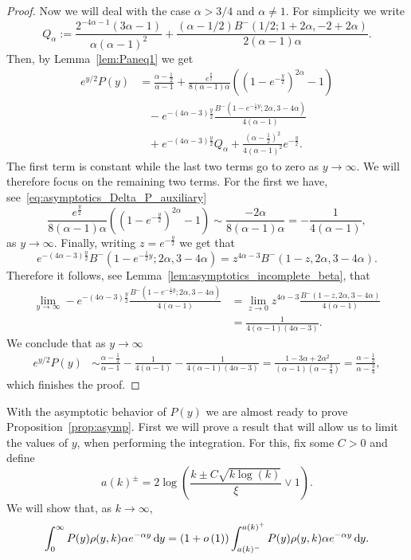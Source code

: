 \begin{proof}
Now we will deal with the case $\alpha > 3/4$ and $\alpha \not = 1$. For simplicity we write
\[
	Q_\alpha := \frac{2^{-4 \alpha-1} (3 \alpha - 1)}{\alpha (\alpha - 1)^2} 
		+ \frac{(\alpha - 1/2 ) B^-(1/2; 1 + 2 \alpha, -2 + 2 \alpha)}{2(\alpha - 1) \alpha}.
\]
Then, by Lemma~\ref{lem:Paneq1} we get
\begin{align*}
	e^{y/2} P(y) &= \frac{\alpha - \frac{1}{2}}{\alpha - 1} 
		+ \frac{e^{\frac{y}{2}}}{8(\alpha - 1)\alpha}\left(\left(1 - e^{-\frac{y}{2}}\right)^{2\alpha}-1\right)\\
	&\hspace{10pt}- e^{-(4\alpha - 3)\frac{y}{2}}\frac{B^-(1 - e^{-\frac{1}{2}y}; 2 \alpha, 3 - 4 \alpha)}{4 (\alpha - 1)}\\
	&\hspace{10pt}+ e^{-(4\alpha - 3)\frac{y}{2}}Q_\alpha + \frac{(\alpha-\frac{1}{2})^2}{4(\alpha-1)^2} e^{-\frac{y}{2}}.
\end{align*}
The first term is constant while the last two terms go to zero as $y \to \infty$. We will therefore focus on the remaining two terms. For the first we have, see~\eqref{eq:asymptotics_Delta_P_auxiliary} 
\[
	\frac{e^{\frac{y}{2}}}{8(\alpha - 1)\alpha}\left(\left(1 - e^{-\frac{y}{2}}\right)^{2\alpha}-1\right) 
	\sim \frac{-2\alpha}{8(\alpha - 1)\alpha} = -\frac{1}{4(\alpha -1)},
\]
as $y \to \infty$. Finally, writing $z = e^{-\frac{y}{2}}$ we get that
\[
	e^{-(4\alpha - 3)\frac{y}{2}} B^-(1 - e^{-\frac{1}{2}y}; 2 \alpha, 3 - 4 \alpha)
	= z^{4\alpha - 3} B^-(1 - z, 2 \alpha, 3 - 4 \alpha).
\]
Therefore it follows, see Lemma~\ref{lem:asymptotics_incomplete_beta}, that
\begin{align*}
	\lim_{y \to \infty} - e^{-(4\alpha - 3)\frac{y}{2}}
		\frac{B^-(1 - e^{-\frac{1}{2}y}; 2 \alpha, 3 - 4 \alpha)}{4 (\alpha - 1)}
	&= \lim_{z \to 0} z^{4\alpha - 3} \frac{B^-(1 - z, 2 \alpha, 3 - 4 \alpha)}{4(\alpha - 1)}\\
	&= \frac{1}{4(\alpha - 1)(4\alpha - 3)}.
\end{align*}
We conclude that as $y \to \infty$
\begin{align*}
	e^{y/2} P(y) 
	&\sim \frac{\alpha - \frac{1}{2}}{\alpha - 1} -\frac{1}{4(\alpha -1)} - \frac{1}{4(\alpha - 1)(4\alpha - 3)}
	= \frac{1 - 3\alpha + 2 \alpha^2}{(\alpha - 1)(\alpha - \frac{3}{4})} 
	= \frac{\alpha - \frac{1}{2}}{\alpha - \frac{3}{4}},
\end{align*}
which finishes the proof.
\end{proof}

With the asymptotic behavior of $P(y)$ we are almost ready to prove Proposition~\ref{prop:asymp}. First we will prove a result that will allow us to limit the values of $y$, when performing the integration. For this, fix some $C > 0$ and define
\[
	a(k)^\pm = 2 \log\left(\frac{k \pm C \sqrt{k \log(k)}}{\xi} \vee 1\right).
\] 
We will show that, as $k \to \infty$,
\begin{equation}\label{eq:asymptotics_average_clustering_concentration}
	\int_0^\infty P(y) \rho(y,k) \alpha e^{-\alpha y} \operatorname{\mathrm{d}\hspace{-2pt}} y
	= (1+o\left(1\right)) \int_{a(k)^-}^{a(k)^+} P(y) \rho(y,k) \alpha e^{-\alpha y} \operatorname{\mathrm{d}\hspace{-2pt}} y.
\end{equation}

